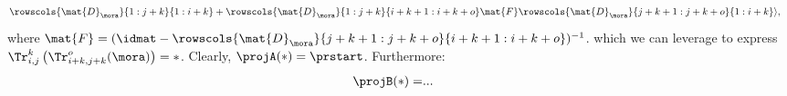 {\begin{example}
\begin{equation}
\begin{aligned}
                                                 & \rowscols{\mat{D}_\mora}{1:j+k}{1:i+k}+\rowscols{\mat{D}_\mora}{1:j+k}{i+k+1:i+k+o}\mat{F} \rowscols{\mat{D}_\mora}{j+k+1:j+k+o}{1:i+k}\rangle,
            \end{aligned}
        \end{equation}
        where $\mat{F}=(\idmat-\rowscols{\mat{D}_\mora}{j+k+1:j+k+o}{i+k+1:i+k+o})^{-1}$.
        which we can leverage to express $\Tr_{i,j}^{k}\left(\Tr_{i+k,j+k}^o(\mora)\right)=\ast$.
        Clearly, $\projA(\ast)=\prstart$.
        Furthermore:
        \begin{equation*}
            \begin{aligned}
                \projB(\ast)= & .
                ..
            \end{aligned}
        \end{equation*}


\end{example}}
